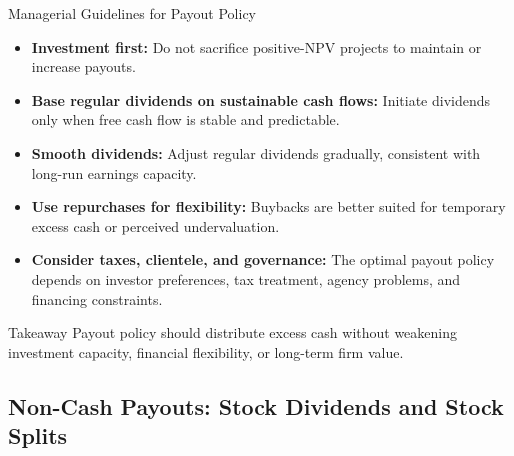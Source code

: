 \begin{frame}{Managerial Guidelines for Payout Policy}

\begin{itemize}
    \item \textbf{Investment first:}
    Do not sacrifice positive-NPV projects to maintain or increase payouts.

    \item \textbf{Base regular dividends on sustainable cash flows:}
    Initiate dividends only when free cash flow is stable and predictable.

    \item \textbf{Smooth dividends:}
    Adjust regular dividends gradually, consistent with long-run earnings capacity.

    \item \textbf{Use repurchases for flexibility:}
    Buybacks are better suited for temporary excess cash or perceived undervaluation.

    \item \textbf{Consider taxes, clientele, and governance:}
    The optimal payout policy depends on investor preferences, tax treatment,
    agency problems, and financing constraints.
\end{itemize}

\vfill

\begin{alertblock}{Takeaway}
Payout policy should distribute excess cash without weakening investment
capacity, financial flexibility, or long-term firm value.
\end{alertblock}

\end{frame}

\subsection{Non-Cash Payouts: Stock Dividends and Stock Splits}

